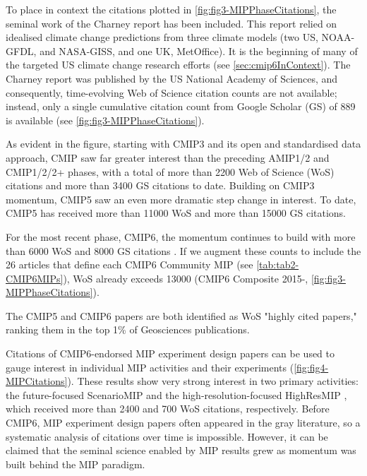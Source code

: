 \documentclass[manuscript]{copernicus}
\begin{document}
To place in context the citations plotted in \autoref{fig:fig3-MIPPhaseCitations}, the seminal work of the Charney report \citep{charney_carbon_1979} has been included. This report relied on idealised climate change predictions from three climate models (two US, NOAA-GFDL, and NASA-GISS, and one UK, MetOffice). It is the beginning of many of the targeted US climate change research efforts (see \autoref{sec:cmip6InContext}). The Charney report was published by the US National Academy of Sciences, and consequently, time-evolving Web of Science citation counts are not available; instead, only a single cumulative citation count from Google Scholar (GS) of 889 is available (see \autoref{fig:fig3-MIPPhaseCitations}).

As evident in the figure, starting with CMIP3 \citep{meehl_global_2007} and its open and standardised data approach, CMIP saw far greater interest than the preceding AMIP1/2 and CMIP1/2/2+ phases, with a total of more than 2200 Web of Science (WoS) citations and more than 3400 GS citations to date. Building on CMIP3 momentum, CMIP5 saw an even more dramatic step change in interest. To date, CMIP5 \citep{taylor_overview_2012} has received more than 11000 WoS and more than 15000 GS citations.

For the most recent phase, CMIP6, the momentum continues to build with more than 6000 WoS and 8000 GS citations \citep{eyring_overview_2016}. If we augment these counts to include the 26 articles that define each CMIP6 Community MIP (see \autoref{tab:tab2-CMIP6MIPs}), WoS already exceeds 13000 (CMIP6 Composite 2015-, \autoref{fig:fig3-MIPPhaseCitations}).

The CMIP5 \citep{taylor_overview_2012} and CMIP6 \citep{eyring_overview_2016} papers are both identified as WoS "highly cited papers," ranking them in the top 1\% of Geosciences publications.

Citations of  CMIP6-endorsed MIP experiment design papers can be used to gauge interest in individual MIP activities and their experiments (\autoref{fig:fig4-MIPCitations}). These results show very strong interest in two primary activities: the future-focused ScenarioMIP \citep{oneill_scenario_2016} and the high-resolution-focused HighResMIP \citep{haarsma_high_2016}, which received more than 2400 and 700 WoS citations, respectively. Before CMIP6, MIP experiment design papers often appeared in the gray literature, so a systematic analysis of citations over time is impossible. However, it can be claimed that the seminal science enabled by MIP results grew as momentum was built behind the MIP paradigm.
\end{document}
